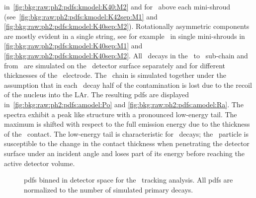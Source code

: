 in~\cref{fig:bkg:raw:ph2:pdfs:kmodel:K40:M2} and for \kvz\ above each mini-shroud
(see~\cref{fig:bkg:raw:ph2:pdfs:kmodel:K42sep:M1} and
\cref{fig:bkg:raw:ph2:pdfs:kmodel:K40sep:M2}). Rotationally asymmetric components are
mostly evident in a single string, see for example \kvn\ in single mini-shrouds in
\cref{fig:bkg:raw:ph2:pdfs:kmodel:K40sep:M1} and
\cref{fig:bkg:raw:ph2:pdfs:kmodel:K40sep:M2}.
\newpar
All \a\ decays in the \Ra\ to \Pbl\ sub-chain and from \Po\ are simulated on the \pplus\
detector surface separately and for different thicknesses of the \pplus\ electrode. The
\Ra\ chain is simulated together under the assumption that in each \a\ decay half of the
contamination is lost due to the recoil of the nucleus into the LAr. The resulting pdfs
are displayed in~\cref{fig:bkg:raw:ph2:pdfs:amodel:Po} and
\cref{fig:bkg:raw:ph2:pdfs:amodel:Ra}. The spectra exhibit a peak like structure with a
pronounced low-energy tail.  The maximum is shifted with respect to the full emission
energy due to the thickness of the \pplus\ contact.  The low-energy tail is characteristic
for \a\ decays; the \a\ particle is susceptible to the change in the contact thickness
when penetrating the detector surface under an incident angle and loses part of its energy
before reaching the active detector volume.

\begin{figure}
  \centering
  \hfill

  \hfill

  \caption{%
    pdfs binned in detector space for the \kvn\ tracking analysis. 
    All pdfs are normalized to the number of simulated primary decays.
  }\label{fig:bkg:raw:ph2:pdfs:kmodel:K40}
\end{figure}

